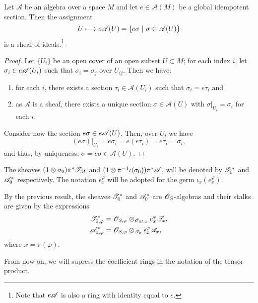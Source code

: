 \begin{proposition}\label{subsheaf}
Let $\mathscr{A}$ be an algebra over a space $M$ and let $e\in \mathscr{A}(M)$ be a global idempotent section. Then the assignment
$$U\longmapsto e\scr{A}(U)=\{e\sigma \ | \ \sigma\in\scr{A}(U)\}$$
is a sheaf of ideals.\footnote{Note that $e\mathscr{A}$ is also a ring with identity equal to $e$.}
\end{proposition}
\begin{proof}
Let $\{U_i\}$ be an open cover of an open subset $U\subset M$; for each index $i$, let $\sigma_i\in e\mathscr{A}(U_i)$ such that $\sigma_i=\sigma_j$ over $U_{ij}$. Then we have:
\begin{enumerate}
\item for each $i$, there exists a section $\tau_i\in \mathscr{A}(U_i)$ such that $\sigma_i=e\tau_i$ and
\item as $\mathscr{A}$ is a sheaf, there exists a unique section $\sigma \in \mathscr{A}(U)$ with $\sigma|_{U_i}=\sigma_i$ for each $i$.
\end{enumerate}
Consider now the section $e\sigma \in e\mathscr{A}(U)$. Then, over $U_i$ we have
$$(e\sigma )|_{U_i}=e\sigma_i=e(e\tau_i)=e\tau_i=\sigma_i,$$
and thus, by uniqueness, $\sigma =e\sigma \in \mathscr{A}(U)$.
\end{proof}

\begin{notation}
The sheaves $(1\otimes \sigma_0)\pi^*\mathscr{T}_M$ and $(1\otimes \pi^{-1}\iota (\sigma_0))\pi^*\mathscr{A}$, will be denoted by $\mathscr{T}^*_0$ and $\mathscr{A}^*_0$ respectively. The notation $\epsilon^{\varphi}_x$ will be adopted for the germ $\iota_x(e^{\varphi}_x)$.
\end{notation}

By the previous result, the sheaves $\mathscr{T}^*_0$ and $\mathscr{A}^*_0$ are $\mathscr{O}_S$-algebras and their stalks are given by the expressions
$$
\begin{aligned}
\mathscr{T}^*_{0,\varphi } &= \mathscr{O}_{S,\varphi }\otimes_{\mathscr{O}_{M,x}}e^{\varphi}_x\mathscr{T}_x, \\
\mathscr{A}^*_{0,\varphi } &= \mathscr{O}_{S,\varphi }\otimes_{\mathscr{T}_x}\epsilon^{\varphi}_x\mathscr{A}_x, \\
\end{aligned}
$$
where $x=\pi (\varphi )$.

\begin{notation}
From now on, we will supress the coefficient rings in the notation of the tensor product.
\end{notation}

